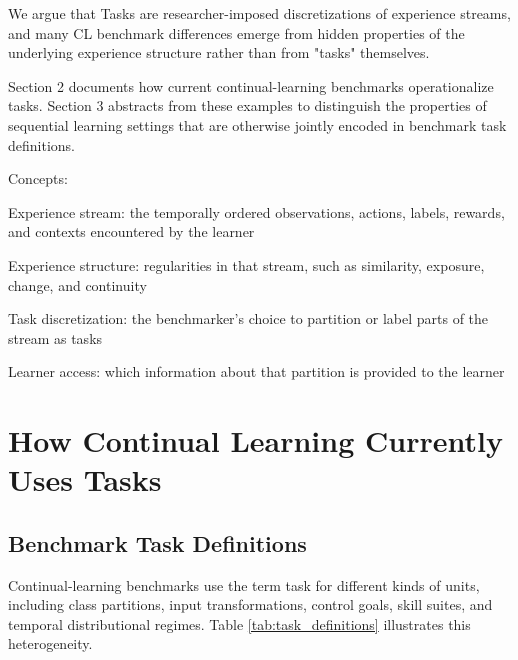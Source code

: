 \documentclass{article}
\begin{document}

        We argue that Tasks are researcher-imposed discretizations of experience streams, and many CL benchmark differences emerge from hidden properties of the underlying experience structure rather than from "tasks" themselves.   


        Section 2 documents how current continual-learning benchmarks operationalize tasks. Section 3 abstracts from these examples to distinguish the properties of sequential learning settings that are otherwise jointly encoded in benchmark task definitions.



        Concepts:
        
        Experience stream: the temporally ordered observations, actions, labels, rewards, and contexts encountered by the learner
        
        Experience structure: regularities in that stream, such as similarity, exposure, change, and continuity
        
        Task discretization: the benchmarker’s choice to partition or label parts of the stream as tasks
        
        Learner access: which information about that partition is provided to the learner

    
    \section{How Continual Learning Currently Uses Tasks}
    
        \subsection{Benchmark Task Definitions}

        Continual-learning benchmarks use the term task for different kinds of units, including class partitions, input transformations, control goals, skill suites, and temporal distributional regimes. Table \ref{tab:task_definitions} illustrates this heterogeneity.
\end{document}
